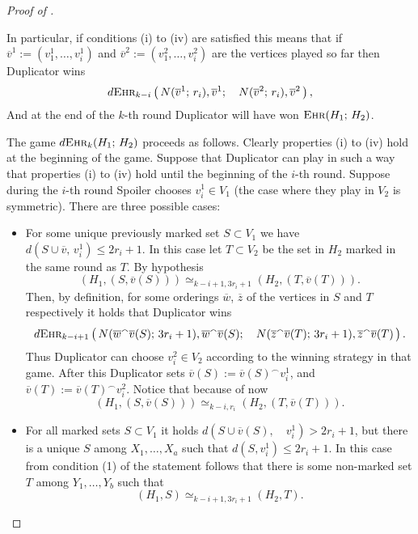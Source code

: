 \documentclass[12pt,notitlepage,a4paper]{article}
\theoremstyle{definition}
\newcommand{\ehr}{\textsc{Ehr}}
\begin{document}
\begin{proof}[Proof of ]
\begin{itemize}
		
	\end{itemize}
	In particular, if conditions (i) to (iv) are satisfied this means
	that if $\overline{v}^1:=(v^1_1,\dots,v^1_i)$ and
	$\overline{v}^2:=(v^2_1,\dots, v^2_i)$ are the vertices played so far
	then Duplicator wins
	\[
	d\ehr_{k-i}\left(\,
	N(\overline{v}^1;\, r_i), \overline{v}^1; \quad
	N(\overline{v}^2;\, r_i),\overline{v}^2 \,
	\right),	
	\]
	And at the end of the $k$-th round Duplicator will have won
	$\ehr(H_1;\, H_2)$. \par
	The game $d\ehr_k(H_1; \, H_2)$ proceeds as follows.
	Clearly properties (i) to (iv) hold at the beginning of 
	the game.  Suppose that
	Duplicator can play in such a way that properties (i) to (iv) hold 
	until the beginning of the $i$-th round. Suppose
	during the $i$-th round Spoiler chooses $v^1_i\in V_1$ 
	(the case where they play in $V_2$ is symmetric). There are 
	three possible cases:
	\begin{itemize}[leftmargin=*]
		\item For some unique previously marked set $S\subset V_1$ 
		we have $d(S\cup \overline{v},\, v^1_i)\leq 2r_i +1$. 
		In this case let $T\subset V_2$ be the set in $H_2$ marked in the 
		same round as $T$. By hypothesis 
		\[ \left(H_1,(S,\overline{v}(S))\right)
		\simeq_{k-i+1,3r_i+1}
		\left(H_2,(T,\overline{v}(T))\right). 		
		\]
		Then, by definition,
		for some orderings $\overline{w}$, $\overline{z}$
		of the vertices in $S$ and $T$ respectively it holds that
		Duplicator wins
		\[
		d\ehr_{k-i+1}\left(\,
		N(\overline{w}^\smallfrown \overline{v}(S); \, 3r_i	+ 1)
		, \overline{w}^\smallfrown \overline{v}(S); \quad
		N(\overline{z}^\smallfrown \overline{v}(T); \, 3r_i	+ 1)
		, \overline{z}^\smallfrown \overline{v}(T)\,	
		\right).		
		\]
		Thus Duplicator can choose $v^2_i\in V_2$ according to the 
		winning strategy in that game. After this Duplicator sets 
		$\overline{v}(S):= \overline{v}(S)^\smallfrown v^1_i$, and
		$\overline{v}(T):= \overline{v}(T)^\smallfrown v^2_i$. Notice
		that because of  now
		\[
		\left(H_1, (S,\overline{v}(S))\right)\simeq_{k-i,r_i}
		\left(H_2, (T,\overline{v}(T))\right).
		\]
		\item For all marked sets $S\subset V_1$ it holds
		$d(S\cup \overline{v}(S), \quad v^1_i)>2r_i +1$, but there is
		a unique $S$ among $X_1,\dots, X_a$ such that
		$d(S,v^1_i)\leq 2r_i+1$. In this case from condition (1)
		of the statement follows that there is some non-marked
		set $T$ among $Y_1,\dots, Y_b$ such that
		\[
		(H_1,S)\simeq_{k-i+1,3r_i+1} (H_2,T).\] 

\end{itemize}
\end{proof}
\end{document}
